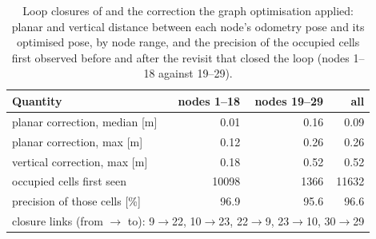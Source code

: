 \begin{table}[htbp]
\centering
\small
\caption[Loop closures and the correction they applied, .]{Loop closures of  and the correction the graph optimisation applied: planar and vertical distance between each node's odometry pose and its optimised pose, by node range, and the precision of the occupied cells first observed before and after the revisit that closed the loop (nodes 1--18 against 19--29).}
\label{tab:insight4-closures}
\begin{tabular}{lrrr}
\toprule
Quantity & nodes 1--18 & nodes 19--29 & all \\
\midrule
planar correction, median [m] & 0.01 & 0.16 & 0.09 \\
planar correction, max [m] & 0.12 & 0.26 & 0.26 \\
vertical correction, max [m] & 0.18 & 0.52 & 0.52 \\
occupied cells first seen & 10098 & 1366 & 11632 \\
precision of those cells [\si{\percent}] & 96.9 & 95.6 & 96.6 \\
\midrule
\multicolumn{4}{l}{closure links (from $\rightarrow$ to): 9$\rightarrow$22, 10$\rightarrow$23, 22$\rightarrow$9, 23$\rightarrow$10, 30$\rightarrow$29} \\
\bottomrule
\end{tabular}
\end{table}
